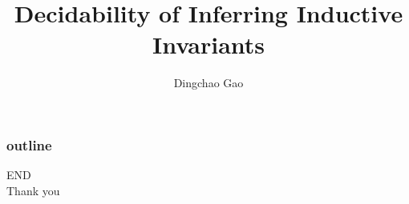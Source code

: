 \documentclass[aspectratio=1610]{beamer}
\title[Inferring Inductive Invariants]{Decidability of Inferring Inductive Invariants}
\author[Gcc]{Dingchao Gao}
\institute[ISCAS]{Institute of Software Chinese Academy of Sciences}
\begin{document}
\begin{frame}[plain]
  \titlepage
\end{frame}
\begin{frame}
  \frametitle{outline}
  \tableofcontents
\end{frame}



\begin{frame}
\centering
\Huge{END\\Thank you}
\end{frame}
\end{document}
